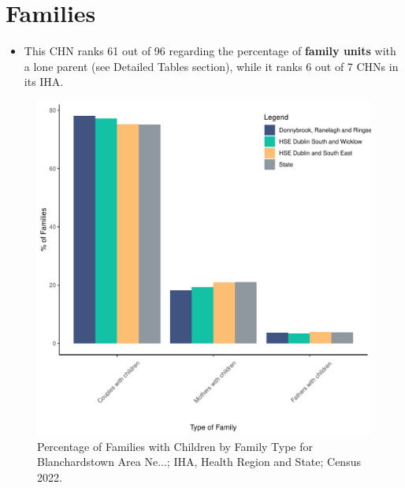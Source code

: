 \documentclass{article}
\begin{document}
\section{Families}\label{sect:Fam}
\begin{itemize}
\item This CHN ranks  61 out of 96 regarding the percentage of \textbf{family units} with a lone parent (see Detailed Tables section), while it ranks   6 out of 7 CHNs in its IHA.
\end{itemize}
\begin{figure}[H]
	\centering
	\includegraphics[width = 150mm]{../figures/FamED.pdf}
	\caption{Percentage of Families with Children by Family Type for Blanchardstown Area Ne...; IHA, Health Region and State; Census 2022.}
	\label{fig:vbnv}
	\end{figure}
	
\end{document}
